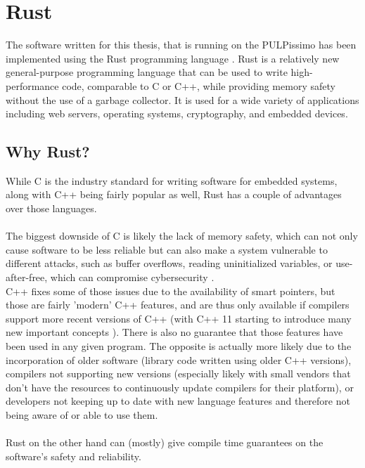 \section{Rust}

The software written for this thesis, that is running on the PULPissimo \cite{pulpissimo} has been implemented using the Rust programming language \cite{rustlang}.
Rust is a relatively new general-purpose programming language that can be used to write high-performance code, comparable
to C or C++, while providing memory safety without the use of a garbage collector.
It is used for a wide variety of applications including web servers, operating systems, cryptography, and embedded devices.

\subsection{Why Rust?}

While C is the industry standard for writing software for embedded systems, along with C++ being fairly popular as well, Rust has a couple of
advantages over those languages.\\\\
The biggest downside of C is likely the lack of memory safety, which can not only cause software to be less reliable but
can also make a system vulnerable to different attacks, such as buffer overflows, reading uninitialized variables, or use-after-free, which can compromise cybersecurity \cite{memory_safety}.\\
C++ fixes some of those issues due to the availability of smart pointers, but those are fairly 'modern' C++ features, and are thus only available if compilers support more recent
versions of C++ (with C++ 11 starting to introduce many new important concepts \cite{cpp11}).
There is also no guarantee that those features have been used in any given program.
The opposite is actually more likely due to the incorporation of older software (library code written using older C++ versions),
compilers not supporting new versions (especially likely with small vendors that don't have the resources to continuously update compilers for their platform),
or developers not keeping up to date with new language features and therefore not being aware of or able to use them.\\\\
Rust on the other hand can (mostly) give compile time guarantees on the software's safety and reliability.

